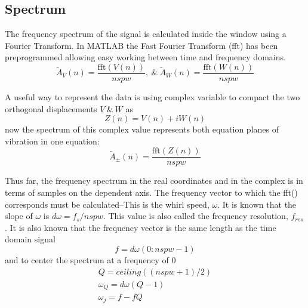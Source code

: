 \subsection{Spectrum}
The frequency spectrum of the signal is calculated inside the window using a Fourier Transform. In MATLAB the Fast Fourier Transform (fft) has been preprogrammed allowing easy working between time and frequency domains.
\begin{equation}\label{eq:FFTReal}
\tilde{A}_V(n) = \frac{\text{fft}(V(n))}{nspw},\ \&\ \tilde{A}_W(n) = \frac{\text{fft}(W(n))}{nspw}
\end{equation}\par 
A useful way to represent the data is using complex variable to compact the two orthogonal displacements $ V\ \&\ W $ as
\begin{equation}\label{eq:ComplexDisplacement}
Z(n) = V(n) + iW(n)
\end{equation}
now the spectrum of this complex value represents both equation planes of vibration in one equation:
\begin{equation}\label{eq:FFTComplex}
\tilde{A}_\pm(n) = \frac{\text{fft}(Z(n))}{nspw}
\end{equation}\par
Thus far, the frequency spectrum in the real coordinates and in the complex is in terms of samples on the dependent axis. The frequency vector to which the fft() corresponds must be calculated--This is the whirl speed, $ \omega $. It is known that the slope of $ \omega $ is $ d\omega=f_s/nspw $. This value is also called the frequency resolution, $ f_{res} $. It is also known that the frequency vector is the same length as the time domain signal 
\begin{equation*}
f=d\omega(0:nspw-1)
\end{equation*}
and to center the spectrum at a frequency of 0
\begin{equation*}
\begin{array}{c}
Q=ceiling((nspw+1)/2)\\
\omega_Q=d\omega(Q-1)\\
\omega_j=f-fQ
\end{array}
\end{equation*}
